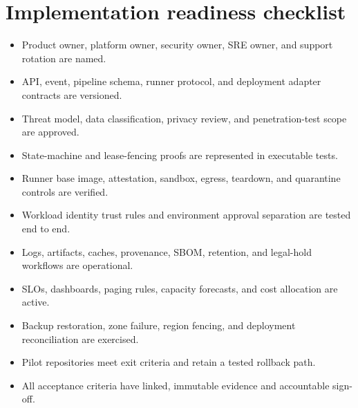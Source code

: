 \section{Implementation readiness checklist}

\begin{itemize}[label=$\square$]
  \item Product owner, platform owner, security owner, SRE owner, and support rotation are named.
  \item API, event, pipeline schema, runner protocol, and deployment adapter contracts are versioned.
  \item Threat model, data classification, privacy review, and penetration-test scope are approved.
  \item State-machine and lease-fencing proofs are represented in executable tests.
  \item Runner base image, attestation, sandbox, egress, teardown, and quarantine controls are verified.
  \item Workload identity trust rules and environment approval separation are tested end to end.
  \item Logs, artifacts, caches, provenance, SBOM, retention, and legal-hold workflows are operational.
  \item SLOs, dashboards, paging rules, capacity forecasts, and cost allocation are active.
  \item Backup restoration, zone failure, region fencing, and deployment reconciliation are exercised.
  \item Pilot repositories meet exit criteria and retain a tested rollback path.
  \item All acceptance criteria have linked, immutable evidence and accountable sign-off.
\end{itemize}

\appendix
